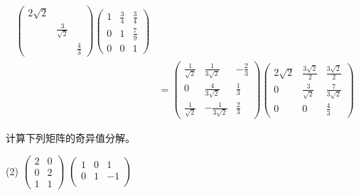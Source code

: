 \documentclass[12pt, a4paper, oneside, UTF8]{ctexbook}
\begin{document}
\begin{solution}
\begin{enumerate}[label=(\arabic*)]
\begin{align*}
\begin{pmatrix}
                2\sqrt{2} & & \\
                & \frac{3}{\sqrt{2}}& \\
                & & \frac{4}{3}
            \end{pmatrix}
            \begin{pmatrix}
                1 &\frac{3}{4}&\frac{3}{4}\\
                0 & 1&\frac{7}{9} \\
                0&0&1
            \end{pmatrix}\\
            &=\begin{pmatrix}
                \frac{1}{\sqrt{2}}& \frac{1}{3\sqrt{2}} & -\frac{2}{3}\\
                0& \frac{4}{3\sqrt{2}}& \frac{1}{3} \\
                \frac{1}{\sqrt{2}} & -\frac{1}{3\sqrt{2}}& \frac{2}{3}
            \end{pmatrix}
            \begin{pmatrix}
                2\sqrt{2} &\frac{3\sqrt{2}}{2}&\frac{3\sqrt{2}}{2}\\
                0 & \frac{3}{\sqrt{2}}&\frac{7}{3\sqrt{2}} \\
                0&0&\frac{4}{3}
            \end{pmatrix}
        \end{align*}
    \end{enumerate}
\end{solution}


\begin{question}
    计算下列矩阵的奇异值分解。
    \begin{tasks}[label=(\arabic*)](2)
        \task $\begin{pmatrix}
            2&0\\
            0&2\\
            1&1
        \end{pmatrix}$
        \task $\begin{pmatrix}
            1&0&1\\
            0&1&-1\\
        \end{pmatrix}$
    \end{tasks}
\end{question}
\end{document}
